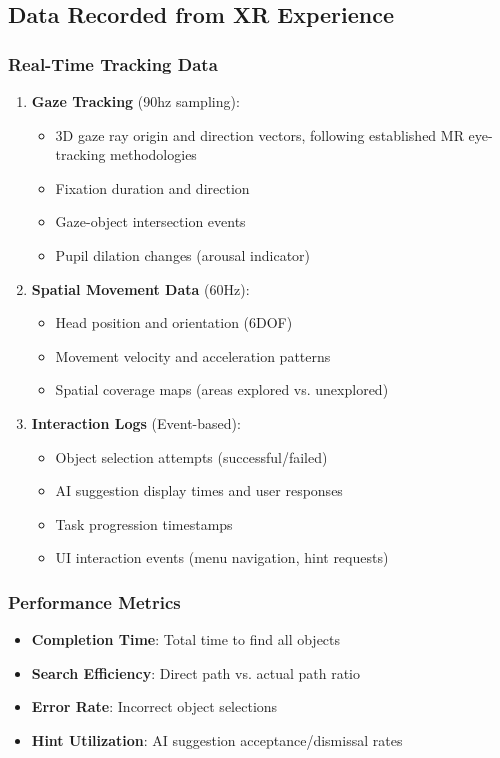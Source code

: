 \documentclass[12pt,letterpaper]{article}
\begin{document}
\subsection{Data Recorded from XR Experience}

\subsubsection{Real-Time Tracking Data}
\begin{enumerate}
    \item \textbf{Gaze Tracking} (90hz sampling):
    \begin{itemize}
        \item 3D gaze ray origin and direction vectors, following established MR eye-tracking methodologies \citep{chiossi2024searching}
        \item Fixation duration and direction
        \item Gaze-object intersection events
        \item Pupil dilation changes (arousal indicator)
    \end{itemize}
    
    \item \textbf{Spatial Movement Data} (60Hz):
    \begin{itemize}
        \item Head position and orientation (6DOF)
        \item Movement velocity and acceleration patterns
        \item Spatial coverage maps (areas explored vs. unexplored)
    \end{itemize}
    
    \item \textbf{Interaction Logs} (Event-based):
    \begin{itemize}
        \item Object selection attempts (successful/failed)
        \item AI suggestion display times and user responses
        \item Task progression timestamps
        \item UI interaction events (menu navigation, hint requests)
    \end{itemize}
\end{enumerate}

\subsubsection{Performance Metrics}
\begin{itemize}
    \item \textbf{Completion Time}: Total time to find all objects
    \item \textbf{Search Efficiency}: Direct path vs. actual path ratio
    \item \textbf{Error Rate}: Incorrect object selections
    \item \textbf{Hint Utilization}: AI suggestion acceptance/dismissal rates
\end{itemize}
\end{document}
